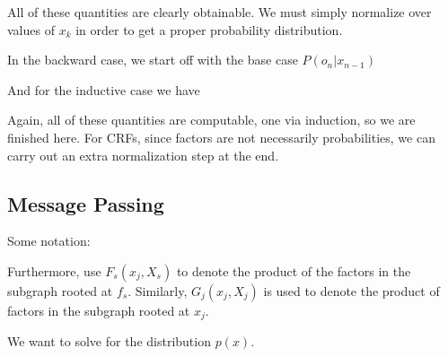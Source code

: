 \documentclass[12pt]{article}
\begin{document}
All of these quantities are clearly obtainable. We must simply normalize over values of $x_k$ in order to get a proper probability distribution.

In the backward case, we start off with the base case $P(o_n|x_{n-1})$


And for the inductive case we have


Again, all of these quantities are computable, one via induction, so we are finished here. For CRFs, since factors are not necessarily probabilities, we can carry out an extra normalization step at the end.

\subsection{Message Passing}

Some notation:

Furthermore, use $F_s(x_j, X_s)$ to denote the product of the factors in the subgraph rooted at $f_s$. Similarly, $G_j(x_j, X_j)$ is used to denote the product of factors in the subgraph rooted at $x_j$. 

We want to solve for the distribution $p(x)$.

\end{document}
